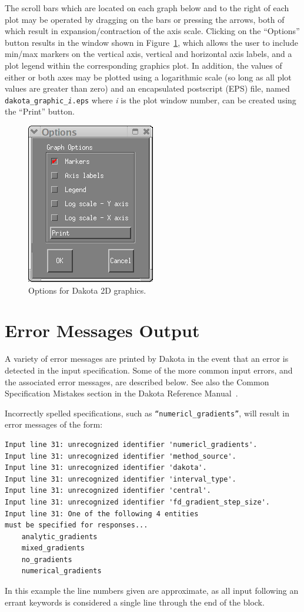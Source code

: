 The scroll bars which are located on each graph below and to the right
of each plot may be operated by dragging on the bars or pressing the
arrows, both of which result in expansion/contraction of the axis
scale. Clicking on the ``Options'' button results in the window shown
in Figure~\ref{output:2dcontoptions}, which allows the user to include
min/max markers on the vertical axis, vertical and horizontal axis
labels, and a plot legend within the corresponding graphics plot.  In
addition, the values of either or both axes may be plotted using a
logarithmic scale (so long as all plot values are greater than zero)
and an encapsulated postscript (EPS) file, named 
\texttt{dakota\_graphic\_\emph{i}.eps} where \emph{i} is the plot 
window number, can be created using the ``Print'' button.
\begin{figure}
\centering
\includegraphics[scale=0.6]{images/container_graphic_options}
\caption{Options for Dakota 2D graphics.}
\label{output:2dcontoptions}
\end{figure}


\section{Error Messages Output}\label{output:error}

A variety of error messages are printed by Dakota in the event that an
error is detected in the input specification. Some of the more common
input errors, and the associated error messages, are described below.
See also the Common Specification Mistakes section in the Dakota
Reference Manual~\cite{RefMan}.

Incorrectly spelled specifications, such as 
\texttt{``numericl\_gradients''}, will result in error messages of the form:
\begin{small}
\begin{verbatim}
Input line 31: unrecognized identifier 'numericl_gradients'.
Input line 31: unrecognized identifier 'method_source'.
Input line 31: unrecognized identifier 'dakota'.
Input line 31: unrecognized identifier 'interval_type'.
Input line 31: unrecognized identifier 'central'.
Input line 31: unrecognized identifier 'fd_gradient_step_size'.
Input line 31: One of the following 4 entities
must be specified for responses...
	analytic_gradients
	mixed_gradients
	no_gradients
	numerical_gradients
\end{verbatim}
\end{small}
In this example the line numbers given are approximate, as all input
following an errant keywords is considered a single line through the
end of the block.

